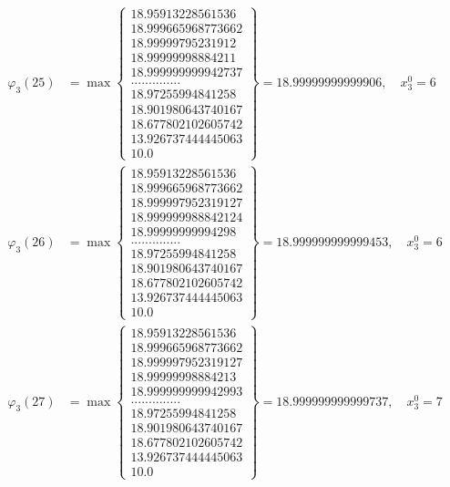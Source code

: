 \documentclass{article}
\begin{document}
\begin{align*}
  
  
  
\varphi_{3}(25) &= \max \left\{ \begin{array}{c}
18.95913228561536 \\
 18.999665968773662 \\
 18.99999795231912 \\
 18.99999998884211 \\
 18.999999999942737 \\
 .............. \\
 18.97255994841258 \\
 18.901980643740167 \\
 18.677802102605742 \\
 13.926737444445063 \\
 10.0
\end{array} \right\} = 18.99999999999906, \quad x_{3}^0 = 6\\
  
  
  
  
\varphi_{3}(26) &= \max \left\{ \begin{array}{c}
18.95913228561536 \\
 18.999665968773662 \\
 18.999997952319127 \\
 18.999999988842124 \\
 18.99999999994298 \\
 .............. \\
 18.97255994841258 \\
 18.901980643740167 \\
 18.677802102605742 \\
 13.926737444445063 \\
 10.0
\end{array} \right\} = 18.999999999999453, \quad x_{3}^0 = 6\\
  
  
  
  
\varphi_{3}(27) &= \max \left\{ \begin{array}{c}
18.95913228561536 \\
 18.999665968773662 \\
 18.999997952319127 \\
 18.99999998884213 \\
 18.999999999942993 \\
 .............. \\
 18.97255994841258 \\
 18.901980643740167 \\
 18.677802102605742 \\
 13.926737444445063 \\
 10.0
\end{array} \right\} = 18.999999999999737, \quad x_{3}^0 = 7\\
  

\end{align*}
\end{document}

